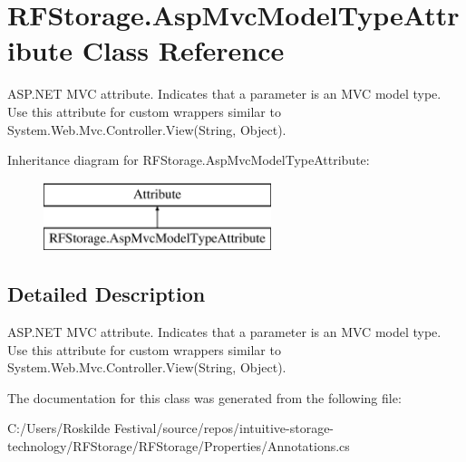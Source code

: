 \hypertarget{class_r_f_storage_1_1_asp_mvc_model_type_attribute}{}\section{R\+F\+Storage.\+Asp\+Mvc\+Model\+Type\+Attribute Class Reference}
\label{class_r_f_storage_1_1_asp_mvc_model_type_attribute}


A\+S\+P.\+N\+ET M\+VC attribute. Indicates that a parameter is an M\+VC model type. Use this attribute for custom wrappers similar to {\ttfamily System.\+Web.\+Mvc.\+Controller.\+View(\+String, Object)}.  


Inheritance diagram for R\+F\+Storage.\+Asp\+Mvc\+Model\+Type\+Attribute\+:\begin{figure}[H]
\begin{center}
\leavevmode
\includegraphics[height=2.000000cm]{class_r_f_storage_1_1_asp_mvc_model_type_attribute}
\end{center}
\end{figure}


\subsection{Detailed Description}
A\+S\+P.\+N\+ET M\+VC attribute. Indicates that a parameter is an M\+VC model type. Use this attribute for custom wrappers similar to {\ttfamily System.\+Web.\+Mvc.\+Controller.\+View(\+String, Object)}. 



The documentation for this class was generated from the following file\+:\begin{DoxyCompactItemize}
\item 
C\+:/\+Users/\+Roskilde Festival/source/repos/intuitive-\/storage-\/technology/\+R\+F\+Storage/\+R\+F\+Storage/\+Properties/Annotations.\+cs\end{DoxyCompactItemize}
